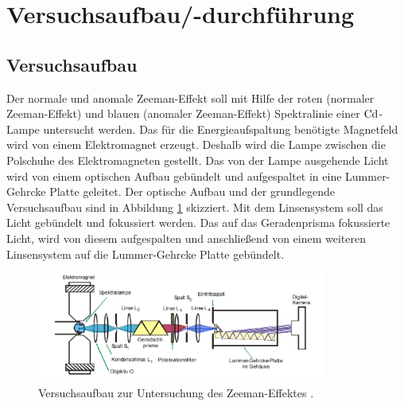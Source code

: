 \section{Versuchsaufbau/-durchführung}

\subsection{Versuchsaufbau}

Der normale und anomale Zeeman-Effekt soll mit Hilfe der roten (normaler Zeeman-Effekt)
und blauen (anomaler Zeeman-Effekt) Spektralinie einer $\ce{Cd}$-Lampe untersucht werden.
Das für die Energieaufspaltung benötigte Magnetfeld wird von einem Elektromagnet erzeugt.
Deshalb wird die Lampe zwischen die Polschuhe des Elektromagneten gestellt.
Das von der Lampe ausgehende Licht wird von einem optischen Aufbau gebündelt und aufgespaltet
in eine Lummer-Gehrcke Platte geleitet. Der optische Aufbau und der grundlegende Versuchsaufbau
sind in Abbildung \ref{fig: versuchsaufbau} skizziert.
Mit dem Linsensystem soll das Licht gebündelt und fokussiert werden.
Das auf das Geradenprisma fokussierte Licht, wird von diesem aufgespalten und anschließend von einem
weiteren Linsensystem auf die Lummer-Gehrcke Platte gebündelt.
\FloatBarrier
\begin{figure}[h]
  \centering
  \includegraphics[width=0.85\textwidth]{pics/versuchsaufbau.png}
  \caption{Versuchsaufbau zur Untersuchung des Zeeman-Effektes \cite{anleitung27}.}
  \label{fig: versuchsaufbau}
\end{figure}
\FloatBarrier

